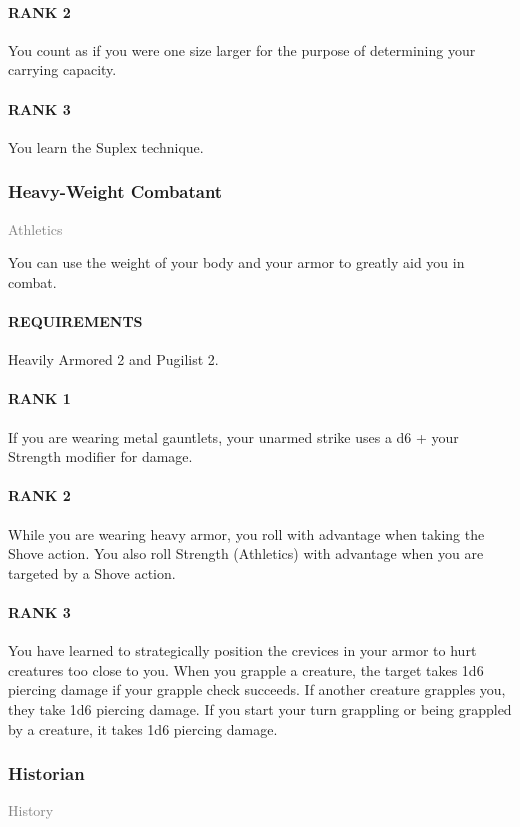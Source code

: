 \paragraph{RANK 2} You count as if you were one size larger for the purpose of determining your carrying capacity.
\paragraph{RANK 3} You learn the Suplex technique.

\subsubsection{Heavy-Weight Combatant} \label{tal::heavyweightcombatant}
\small{\textcolor{gray}{Athletics}}

\normalsize
You can use the weight of your body and your armor to greatly aid you in combat.
\paragraph{REQUIREMENTS} Heavily Armored 2 and Pugilist 2.
\paragraph{RANK 1} If you are wearing metal gauntlets, your unarmed strike uses a d6 + your Strength modifier for damage.
\paragraph{RANK 2} While you are wearing heavy armor, you roll with advantage when taking the Shove action.
You also roll Strength (Athletics) with advantage when you are targeted by a Shove action.
\paragraph{RANK 3} You have learned to strategically position the crevices in your armor to hurt creatures too close to you.
When you grapple a creature, the target takes 1d6 piercing damage if your grapple check succeeds.
If another creature grapples you, they take 1d6 piercing damage.
If you start your turn grappling or being grappled by a creature, it takes 1d6 piercing damage.

\subsubsection{Historian} \label{tal::historian}
\small{\textcolor{gray}{History}}


